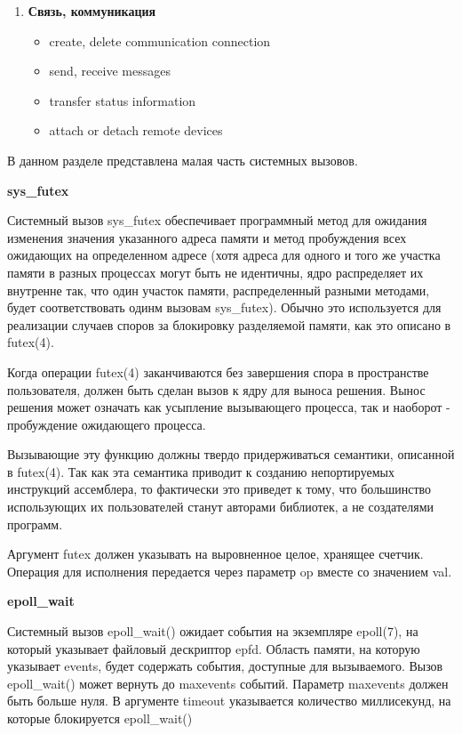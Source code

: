 \documentclass[a4paper, 14pt]{article}
\begin{document}
\begin{enumerate}
\item \textbf{Связь, коммуникация}

\begin{itemize}
    \item create, delete communication connection
    \item send, receive messages
    \item transfer status information
    \item attach or detach remote devices
\end{itemize}

\end{enumerate}

\par В данном разделе представлена малая часть системных вызовов.

\textbf{sys\_futex}

\par Системный вызов sys\_futex обеспечивает программный метод для ожидания изменения значения указанного адреса памяти и метод пробуждения всех ожидающих на определенном адресе (хотя адреса для одного и того же участка памяти в разных процессах могут быть не идентичны, ядро распределяет их внутренне так, что один участок памяти, распределенный разными методами, будет соответствовать одинм вызовам sys\_futex). Обычно это используется для реализации случаев споров за блокировку разделяемой памяти, как это описано в futex(4).

\par Когда операции futex(4) заканчиваются без завершения спора в пространстве пользователя, должен быть сделан вызов к ядру для выноса решения. Вынос решения может означать как усыпление вызывающего процесса, так и наоборот - пробуждение ожидающего процесса.

\par Вызывающие эту функцию должны твердо придерживаться семантики, описанной в futex(4). Так как эта семантика приводит к созданию непортируемых инструкций ассемблера, то фактически это приведет к тому, что большинство использующих их пользователей станут авторами библиотек, а не создателями программ.

\par Аргумент futex должен указывать на выровненное целое, хранящее счетчик. Операция для исполнения передается через параметр op вместе со значением val.

\textbf{epoll\_wait}

\par Системный вызов epoll\_wait() ожидает события на экземпляре epoll(7), на который указывает файловый дескриптор epfd. Область памяти, на которую указывает events, будет содержать события, доступные для вызываемого. Вызов epoll\_wait() может вернуть до maxevents событий. Параметр maxevents должен быть больше нуля.
В аргументе timeout указывается количество миллисекунд, на которые блокируется epoll\_wait()
\end{document}
